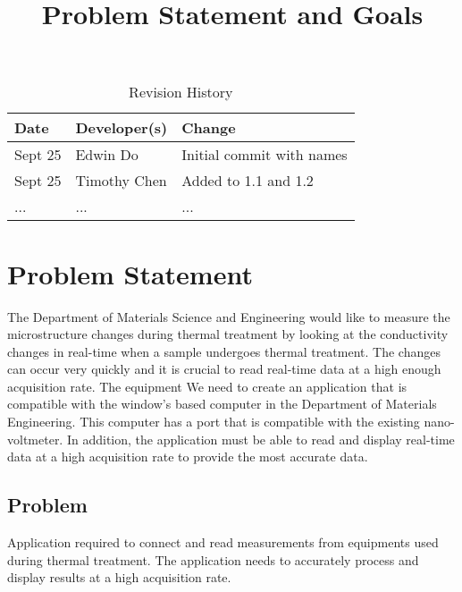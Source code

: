 \documentclass{article}
\title{Problem Statement and Goals\\\progname}
\author{\authname}
\date{}
\begin{document}
\maketitle

\begin{table}[hp]
\caption{Revision History} \label{TblRevisionHistory}
\begin{tabularx}{\textwidth}{llX}
\toprule
\textbf{Date} & \textbf{Developer(s)} & \textbf{Change}\\
\midrule
Sept 25 & Edwin Do & Initial commit with names\\
Sept 25 & Timothy Chen & Added to 1.1 and 1.2 \\
... & ... & ...\\
\bottomrule
\end{tabularx}
\end{table}

\section{Problem Statement}
The Department of Materials Science and Engineering would like to measure the microstructure changes
during thermal treatment by looking at the conductivity changes in real-time when a sample undergoes 
thermal treatment. The changes can occur very quickly and it is crucial to read real-time data at a high enough acquisition rate.
The equipment 
We need to create an application that is compatible with the window's based computer in the Department of Materials Engineering.
This computer has a
port that is compatible with the existing nano-voltmeter. 
In addition, the application must be able to read and display real-time data at a high acquisition rate to provide the most accurate data.



\subsection{Problem}
Application required to connect and read measurements from equipments used during thermal treatment.
The application needs to accurately process and display results at a high acquisition rate.

\end{document}
